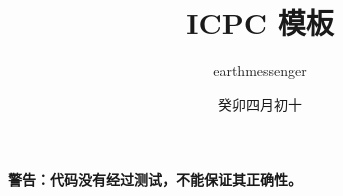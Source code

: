 \documentclass{article}
\title{ICPC 模板}
\author{earthmessenger}
\date{癸卯四月初十}
\begin{document}
\maketitle

\clearpage

\textbf{警告：代码没有经过测试，不能保证其正确性。}

\tableofcontents






\end{document}
